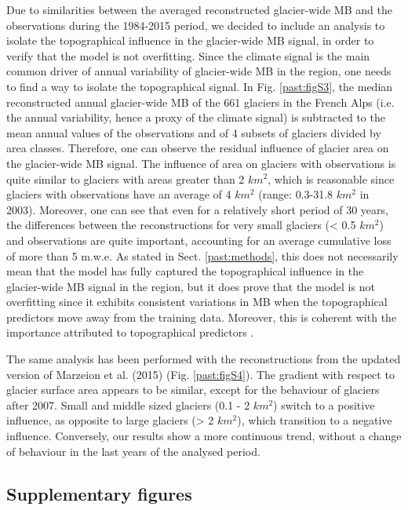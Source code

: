 {Due to similarities between the averaged reconstructed glacier-wide MB and the observations during the 1984-2015 period, we decided to include an analysis to isolate the topographical influence in the glacier-wide MB signal, in order to verify that the model is not overfitting. Since the climate signal is the main common driver of annual variability of glacier-wide MB in the region, one needs to find a way to isolate the topographical signal. In Fig. \ref{past:figS3}, the median reconstructed annual glacier-wide MB of the 661 glaciers in the French Alps (i.e. the annual variability, hence a proxy of the climate signal) is subtracted to the mean annual values of the observations and of 4 subsets of glaciers divided by area classes. Therefore, one can observe the residual influence of glacier area on the glacier-wide MB signal. The influence of area on glaciers with observations is quite similar to glaciers with areas greater than 2 $km^{2}$, which is reasonable since glaciers with observations have an average of 4 $km^{2}$ (range: 0.3-31.8 $km^{2}$ in 2003). Moreover, one can see that even for a relatively short period of 30 years, the differences between the reconstructions for very small glaciers (< 0.5 $km^{2}$) and observations are quite important, accounting for an average cumulative loss of more than 5 m.w.e. As stated in Sect. \ref{past:methods}, this does not necessarily mean that the model has fully captured the topographical influence in the glacier-wide MB signal in the region, but it does prove that the model is not overfitting since it exhibits consistent variations in MB when the topographical predictors move away from the training data. Moreover, this is coherent with the importance attributed to topographical predictors \citep{bolibar_deep_2020-1}. 

The same analysis has been performed with the reconstructions from the updated version of Marzeion et al. (2015) (Fig. \ref{past:figS4}). The gradient with respect to glacier surface area appears to be similar, except for the behaviour of glaciers after 2007. Small and middle sized glaciers (0.1 - 2 $km^{2}$) switch to a positive influence, as opposite to large glaciers (> 2 $km^{2}$), which transition to a negative influence. Conversely, our results show a more continuous trend, without a change of behaviour in the last years of the analysed period. 

\newpage
\subsection{Supplementary figures}

}
